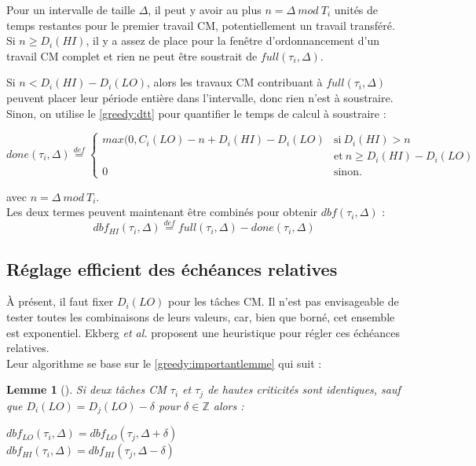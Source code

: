 \documentclass[12pt,a4paper,oneside]{book}
\theoremstyle{break}
\theoremstyle{breakplain}
\newtheorem{lem}{Lemme}[chapter]
\begin{document}
Pour un intervalle de taille $\Delta$, il peut y avoir au plus $n = \Delta\ mod\ T_i$ unités de temps restantes pour le premier travail CM, potentiellement un travail transféré. Si $n \ge D_i(HI)$, il y a assez de place pour la fenêtre d'ordonnancement d'un travail CM complet et rien ne peut être soustrait de $full(\tau_i, \Delta)$.

\pagebreak 

\noindent Si $n < D_i(HI) - D_i(LO)$, alors les travaux CM contribuant à $full(\tau_i, \Delta)$ peuvent placer leur période entière dans l'intervalle, donc rien n'est à soustraire. Sinon, on utilise le \autoref{greedy:dtt} pour quantifier le temps de calcul à soustraire :

\begin{center}
$$
done(\tau_i, \Delta) \overset{def}{=} \left\{
    \begin{array}{ll}
        max(0, C_i(LO)-n+D_i(HI) - D_i(LO) & \mbox{si}\ D_i(HI) > n\\
        & \mbox{et}\ n \ge D_i(HI) - D_i(LO) \\
        0 & \mbox{sinon.}
    \end{array}
\right.
$$
\end{center}

avec $n = \Delta\ mod\ T_i$.\\

Les deux termes peuvent maintenant être combinés pour obtenir $dbf(\tau_i, \Delta)$ :
\begin{equation}
dbf_{HI}(\tau_i, \Delta) \overset{def}{=} full(\tau_i, \Delta) - done(\tau_i, \Delta)
\end{equation}

\subsection{Réglage efficient des échéances relatives}
À présent, il faut fixer $D_i(LO)$ pour les tâches CM. Il n'est pas envisageable de tester toutes les combinaisons de leurs valeurs, car, bien que borné, cet ensemble est exponentiel. Ekberg \textit{et al.} proposent une heuristique pour régler ces échéances relatives.\\

Leur algorithme se base sur le \autoref{greedy:importantlemme} qui suit :
\begin{lem}[\cite{ekberg2012outstanding}]
\label{greedy:importantlemme}
Si deux tâches CM $\tau_i$ et $\tau_j$ de hautes criticités sont identiques, sauf que $D_i(LO) = D_j(LO) - \delta$ pour $\delta \in \mathbb{Z}$ alors :
\begin{center}
$dbf_{LO}(\tau_i, \Delta) = dbf_{LO}(\tau_j, \Delta + \delta) $\\
$dbf_{HI}(\tau_i, \Delta) = dbf_{HI}(\tau_j, \Delta - \delta)$
\end{center} 
\end{lem}
\end{document}
